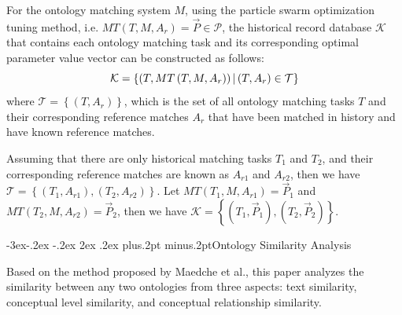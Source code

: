 \documentclass[twoside]{article}
\makeatletter
\def\subsection{\@startsection{subsection}{2}{\z@}%
 {-3ex\@plus -.2ex \@minus -.2ex}%
 {2ex \@plus.2ex}%
{\normalfont\normalsize\protect\baselineskip=12.5pt plus.2pt minus.2pt\bfseries}}
\makeatother
\begin{document}
For the ontology matching system $M$, using the particle swarm optimization tuning method, i.e. $M T\left(T, M, A_{r}\right)=\vec{P} \in \mathcal{P}$, the historical record database $\mathcal{K}$ that contains each ontology matching task and its corresponding optimal parameter value vector can be constructed as follows:
\begin{equation}
	\numberwithin{equation}{section}
\mathcal{K}=\left\{\left(T, M T\left(T, M, A_{r}\right)\right) |\left(T, A_{r}\right) \in \mathcal{T}\right\}
\end{equation}
where $\mathcal{T}=\left\{\left(T, A_{r}\right)\right\}$, which is the set of all ontology matching tasks $T$ and their corresponding reference matches $A_{r}$ that have been matched in history and have known reference matches.

Assuming that there are only historical matching tasks ${T_{1}}$ and ${T_{2}}$,
and their corresponding reference matches are known as ${A_{r 1}}$ and ${A_{r 2}}$,
then we have $\mathcal{T}=\left\{\left(T_{1}, A_{r 1}\right),\left(T_{2}, A_{r 2}\right)\right\}$.
Let $M T\left(T_{1}, M, A_{r 1}\right)=\vec{P}_{1}$ and $M T\left(T_{2}, M, A_{r 2}\right)=\vec{P}_{2}$,
then we have $\mathcal{K}=\left\{\left(T_{1}, \vec{P}_{1}\right),\left(T_{2}, \vec{P}_{2}\right)\right\}$.

\subsection{Ontology Similarity Analysis}

Based on the method proposed by Maedche et al.\cite{wwy51}, this paper analyzes the similarity between any two ontologies from three aspects: text similarity, conceptual level similarity, and conceptual relationship similarity.
\end{document}
